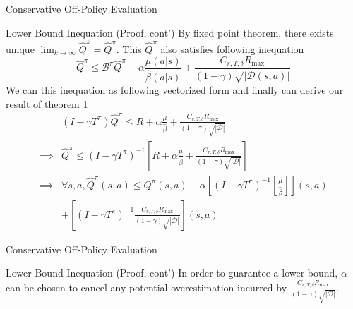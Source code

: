 \documentclass[11pt]{beamer}
\newcommand{\mc}[1]{\mathcal{#1}}
\newcommand{\abs}[1]{\left\lvert #1 \right\rvert}
\begin{document}
\begin{frame}{Conservative Off-Policy Evaluation}
  \begin{block}{Lower Bound Inequation (Proof, cont')}
    By fixed point theorem, there exists unique $\lim_{k \to \infty}\hat{Q}^{k} = \hat{Q}^\pi$.
    This $\hat{Q}^\pi$ also satisfies following inequation
    \[
      \hat{Q}^\pi \leq \mc{B}^\pi \hat{Q}^\pi - \alpha \frac{\mu(a|s)}{\hat{\beta}(a|s)} + \frac{C_{r,T,\delta}R_{\text{max}}}{(1-\gamma) \sqrt{\abs{\mc{D}(s,a)}}}
    \]
    We can this inequation as following vectorized form and finally can derive our result of theorem 1
    \[
      \begin{aligned}
        &(I - \gamma T^\pi) \hat{Q}^\pi \leq R + \alpha \frac{\mu}{\hat{\beta}} +\frac{C_{r,T,\delta}R_{\text{max}}}{(1-\gamma) \sqrt{\abs{\mc{D}}}} \\
        \implies&\hat{Q}^\pi \leq (I - \gamma T^\pi)^{-1} \left[ R + \alpha \frac{\mu}{\hat{\beta}} + \frac{C_{r,T,\delta}R_{\text{max}}}{(1-\gamma) \sqrt{\abs{\mc{D}}}}\right] \\
        \implies &\forall s,a, \hat{Q}^\pi(s,a) \leq Q^\pi (s,a) - \alpha \left[ (I - \gamma T^\pi)^{-1}\left[\frac{\mu}{\hat{\beta}}\right]\right](s,a) \\
        &+ \left[(I - \gamma T^\pi)^{-1} \frac{C_{r,T,\delta}R_{\text{max}}}{(1-\gamma) \sqrt{\abs{\mc{D}}}}\right] (s,a)
      \end{aligned}
    \]
  \end{block}
\end{frame}

\begin{frame}{Conservative Off-Policy Evaluation}
  \begin{block}{Lower Bound Inequation (Proof, cont')}
    In order to guarantee a lower bound, $\alpha$ can be chosen to cancel any potential \hypertarget{text:why_only_consider_overestimation}{overestimation incurred} by $\frac{C_{r,T,\delta}R_{\text{max}}}{(1-\gamma) \sqrt{\abs{\mc{D}}}}$.

  \end{block}
\end{frame}
\end{document}
